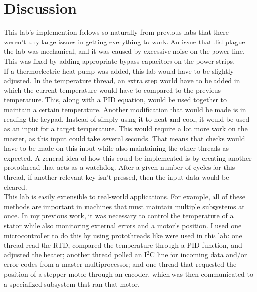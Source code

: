 \documentclass{article}
\begin{document}

\section{Discussion}
\label{sec:Discussion}

This lab's implemention follows so naturally from previous labs that there weren't any large issues in getting everything to work. An issue that did plague the lab was mechanical, and it was caused by excessive noise on the power line. This was fixed by adding appropriate bypass capacitors on the power strips.\\

\noindent If a thermoelectric heat pump was added, this lab would have to be slightly adjusted. In the temperature thread, an extra step would have to be added in which the current temperature would have to compared to the previous temperature. This, along with a PID equation, would be used together to maintain a certain temperature. Another modification that would be made is in reading the keypad. Instead of simply using it to heat and cool, it would be used as an input for a target temperature. This would require a lot more work on the master, as this input could take several seconds. That means that checks would have to be made on this input while also maintaining the other threads as expected. A general idea of how this could be implemented is by creating another protothread that acts as a watchdog. After a given number of cycles for this thread, if another relevant key isn't pressed, then the input data would be cleared.\\


\noindent This lab is easily extensible to real-world applications. For example, all of these methods are important in machines that must maintain multiple subsystems at once. In my previous work, it was necessary to control the temperature of a stator while also monitoring external errors and a motor's position. I used one microcontroller to do this by using protothreads like were used in this lab: one thread read the RTD, compared the temperature through a PID function, and adjusted the heater; another thread polled an I\(^2\)C line for incoming data and/or error codes from a master multiprocessor; and one thread that requested the position of a stepper motor through an encoder, which was then communicated to a specialized subsystem that ran that motor.\\
\end{document}
